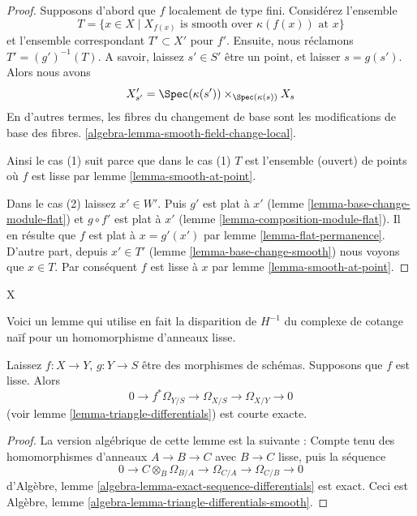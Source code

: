 \begin{proof}

Supposons d'abord que $f$ localement de type fini. Considérez l'ensemble
$$
T = \{x \in X \mid X_{f(x)}\text{ is smooth over }\kappa(f(x))\text{ at }x\}
$$
et l'ensemble correspondant $T' \subset X'$ pour $f'$. Ensuite, nous réclamons
$T' = (g')^{-1}(T)$. A savoir, laissez $s' \in S'$ être un point, et laisser
$s = g(s')$. Alors nous avons
$$
X'_{s'} =
\Spec(\kappa(s')) \times_{\Spec(\kappa(s))} X_s
$$
En d'autres termes, les fibres du changement de base sont les modifications de base des fibres. \ref{algebra-lemma-smooth-field-change-local}.

\medskip\noindent
Ainsi le cas (1) suit parce que dans le cas (1) $T$ est l'ensemble (ouvert) de points où $f$ est lisse par lemme \ref{lemma-smooth-at-point}.

\medskip\noindent
Dans le cas (2) laissez $x' \in W'$. Puis $g'$ est plat à $x'$ (lemme \ref{lemma-base-change-module-flat}) et $g \circ f'$ est plat à $x'$ (lemme \ref{lemma-composition-module-flat}). Il en résulte que $f$ est plat à $x = g'(x')$ par lemme \ref{lemma-flat-permanence}. D'autre part, depuis $x' \in T'$ (lemme \ref{lemma-base-change-smooth}) nous voyons que $x \in T$. Par conséquent $f$ est lisse à $x$ par lemme \ref{lemma-smooth-at-point}.
\end{proof}
X

\noindent
Voici un lemme qui utilise en fait la disparition de $H^{-1}$ du complexe de cotange naïf pour un homomorphisme d'anneaux lisse.

\begin{lemma}

\label{lemma-triangle-differentials-smooth}
Laissez $f : X \to Y$, $g : Y \to S$ être des morphismes de schémas. Supposons que $f$ est lisse. Alors $$
0 \to f^*\Omega_{Y/S} \to \Omega_{X/S} \to \Omega_{X/Y} \to 0
$$ (voir lemme \ref{lemma-triangle-differentials}) est courte exacte.
\end{lemma}

\begin{proof}
La version algébrique de cette lemme est la suivante : Compte tenu des homomorphismes d'anneaux $A \to B \to C$ avec $B \to C$ lisse, puis la séquence $$
0 \to C \otimes_B \Omega_{B/A} \to \Omega_{C/A} \to \Omega_{C/B} \to 0
$$ d'Algèbre, lemme \ref{algebra-lemma-exact-sequence-differentials} est exact. Ceci est Algèbre, lemme \ref{algebra-lemma-triangle-differentials-smooth}.
\end{proof}

